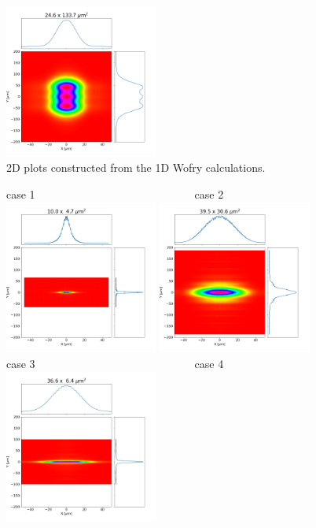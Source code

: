 \documentclass{iucr}              %
\begin{document}
\begin{figure}
    \includegraphics[width=0.45\textwidth]{figures/case4_wofry_ws_results.png}
    \caption{2D plots constructed from the 1D Wofry calculations.}
\end{figure}

\begin{figure}\label{fig:comsyl}
    \centering
    case 1~~~~~~~~~~~~~~~~~~~~~~~~~~~~~case 2\\
    \includegraphics[width=0.45\textwidth]{figures/case1_comsyl.png}
    \includegraphics[width=0.45\textwidth]{figures/case2_comsyl.png}\\
    case 3~~~~~~~~~~~~~~~~~~~~~~~~~~~~~case 4\\
    \includegraphics[width=0.45\textwidth]{figures/case3_comsyl.png}

\end{figure}
\end{document}
